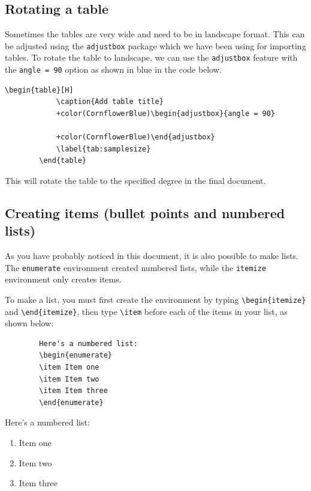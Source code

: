 \documentclass[12pts]{article}
\begin{document}
	\subsection{Rotating a table}
	
	Sometimes the tables are very wide and need to be in landscape format. This can be adjusted using the \texttt{adjustbox} package which we have been using for importing tables. To rotate the table to landscape, we can use the \texttt{adjustbox} feature with the \texttt{angle = 90} option as shown in blue in the code below.
	
	\begin{minipage}{\textwidth}
		\begin{Verbatim}[commandchars=+\(\)]
		\begin{table}[H]
			\caption{Add table title}
			+color(CornflowerBlue)\begin{adjustbox}{angle = 90} 
				
			+color(CornflowerBlue)\end{adjustbox}
			\label{tab:samplesize}
		\end{table}
		\end{Verbatim}
	\end{minipage}
	
	
	This will rotate the table to the specified degree in the final document. 
	
	\subsection{Creating items (bullet points and numbered lists)}
	
	As you have probably noticed in this document, it is also possible to make lists. The \texttt{enumerate} environment created numbered lists, while the \texttt{itemize} environment only creates items.
	
	To make a list, you must first create the environment by typing \verb|\begin{itemize}| and \verb|\end{itemize}|, then type \verb|\item| before each of the items in your list, as shown below:
	
	\begin{multicols}{2}
		\begin{Verbatim}
		Here's a numbered list:
		\begin{enumerate}
		\item Item one
		\item Item two
		\item Item three
		\end{enumerate}
		\end{Verbatim}
		
		\columnbreak	
		
		Here's a numbered list:
		\begin{enumerate}
			\item Item one
			\item Item two
			\item Item three
		\end{enumerate}
	\end{multicols}
	
\end{document}
